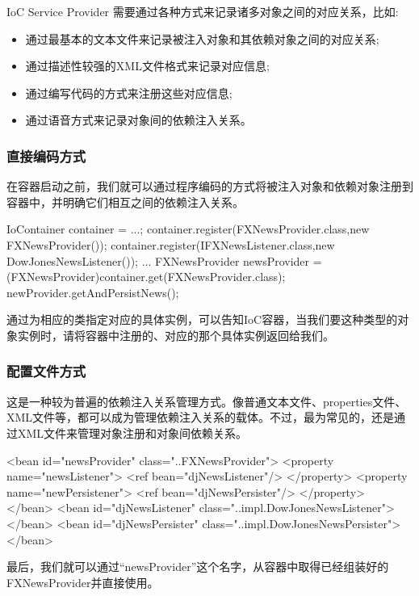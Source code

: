 IoC Service Provider 需要通过各种方式来记录诸多对象之间的对应关系，比如:
\begin{itemize}
    \item 通过最基本的文本文件来记录被注入对象和其依赖对象之间的对应关系;
    \item 通过描述性较强的XML文件格式来记录对应信息;
    \item 通过编写代码的方式来注册这些对应信息;
    \item 通过语音方式来记录对象间的依赖注入关系。
\end{itemize}

\subsubsection{直接编码方式}

在容器启动之前，我们就可以通过程序编码的方式将被注入对象和依赖对象注册到容器中，并明确它们相互之间的依赖注入关系。

\begin{Java}
IoContainer container = ...; 
container.register(FXNewsProvider.class,new FXNewsProvider()); 
container.register(IFXNewsListener.class,new DowJonesNewsListener()); 
... 
FXNewsProvider newsProvider = (FXNewsProvider)container.get(FXNewsProvider.class); 
newProvider.getAndPersistNews(); 
\end{Java}

通过为相应的类指定对应的具体实例，可以告知IoC容器，当我们要这种类型的对象实例时，请将容器中注册的、对应的那个具体实例返回给我们。

\subsubsection{配置文件方式}

这是一种较为普遍的依赖注入关系管理方式。像普通文本文件、properties文件、XML文件等，都可以成为管理依赖注入关系的载体。不过，最为常见的，还是通过XML文件来管理对象注册和对象间依赖关系。

\begin{xml}
<bean id="newsProvider" class="..FXNewsProvider">
    <property  name="newsListener">
        <ref  bean="djNewsListener"/>
    </property>
    <property  name="newPersistener">
        <ref  bean="djNewsPersister"/>
    </property>
</bean>
<bean id="djNewsListener"    class="..impl.DowJonesNewsListener">
</bean>
<bean id="djNewsPersister"    class="..impl.DowJonesNewsPersister">
</bean> 
\end{xml}

最后，我们就可以通过“newsProvider”这个名字，从容器中取得已经组装好的FXNewsProvider并直接使用。

